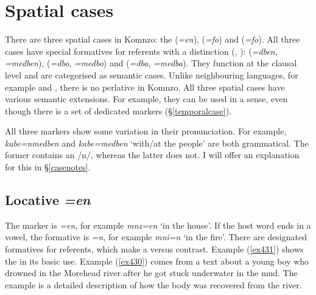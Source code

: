 \section{Spatial cases} \label{spatialcase}

There are three spatial cases in Komnzo: the  (\emph{=en}),  (\emph{=fo}) and  (\emph{=fo}). All three cases have special formatives for  referents with a  distinction ({\Sg}, {\Nsg}):  (\emph{=dben}, \emph{=medben}),  (\emph{=dbo}, \emph{=medbo}) and  (\emph{=dba}, \emph{=medba}). They function at the clausal level and are categorised as semantic cases. Unlike neighbouring languages, for example  and , there is no perlative  in Komnzo. All three spatial cases have various semantic extensions. For example, they can be used in a  sense, even though there is a set of dedicated   markers ({\S}\ref{temporalcase}).

All three    markers show some variation in their pronunciation. For example, \emph{kabe=nmedben} and \emph{kabe=medben} `with/at the people' are both grammatical. The former contains an /n/, whereas the latter does not. I will offer an explanation for this in {\S}\ref{casenotes}.

\subsection{Locative \emph{=en}} \label{locativecase}

The   marker is \emph{=en}, for example \emph{mnz=en} `in the house'. If the host word ends in a vowel, the formative is \emph{=n}, for example \emph{mni=n} `in the fire'. There are designated formatives for  referents, which make a  versus  contrast. Example (\ref{ex431}) shows the   in its basic use. Example (\ref{ex430}) comes from a text about a young boy who drowned in the Morehead river after he got stuck underwater in the mud. The example is a detailed description of how the body was recovered from the river.

